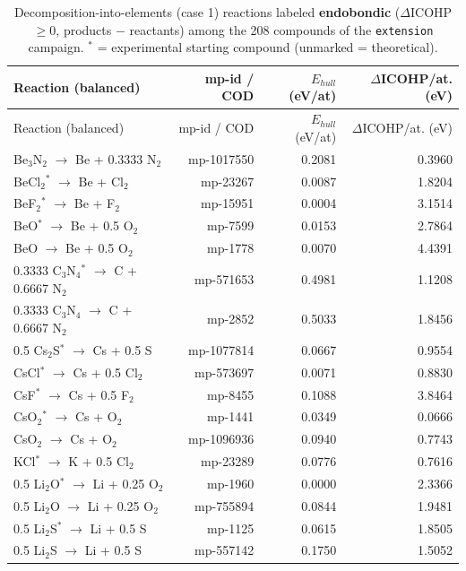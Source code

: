 \begin{longtable}{@{}lrrr@{}}
\caption{Decomposition-into-elements (case 1) reactions labeled \textbf{endobondic} ($\Delta$ICOHP $\geq 0$, products $-$ reactants) among the 208 compounds of the \texttt{extension} campaign. $^*$ = experimental starting compound (unmarked = theoretical).}\\
\toprule
Reaction (balanced) & mp-id / COD & $E_{hull}$ (eV/at) & $\Delta$ICOHP/at. (eV) \\
\midrule
\endfirsthead
\toprule
Reaction (balanced) & mp-id / COD & $E_{hull}$ (eV/at) & $\Delta$ICOHP/at. (eV) \\
\midrule
\endhead
\bottomrule
\endfoot
0.3333 Be$_{3}$N$_{2}$ $\rightarrow$ Be + 0.3333 N$_{2}$ & mp-1017550 & 0.2081 & 0.3960 \\
BeCl$_{2}$$^*$ $\rightarrow$ Be + Cl$_{2}$ & mp-23267 & 0.0087 & 1.8204 \\
BeF$_{2}$$^*$ $\rightarrow$ Be + F$_{2}$ & mp-15951 & 0.0004 & 3.1514 \\
BeO$^*$ $\rightarrow$ Be + 0.5 O$_{2}$ & mp-7599 & 0.0153 & 2.7864 \\
BeO $\rightarrow$ Be + 0.5 O$_{2}$ & mp-1778 & 0.0070 & 4.4391 \\
0.3333 C$_{3}$N$_{4}$$^*$ $\rightarrow$ C + 0.6667 N$_{2}$ & mp-571653 & 0.4981 & 1.1208 \\
0.3333 C$_{3}$N$_{4}$ $\rightarrow$ C + 0.6667 N$_{2}$ & mp-2852 & 0.5033 & 1.8456 \\
0.5 Cs$_{2}$S$^*$ $\rightarrow$ Cs + 0.5 S & mp-1077814 & 0.0667 & 0.9554 \\
CsCl$^*$ $\rightarrow$ Cs + 0.5 Cl$_{2}$ & mp-573697 & 0.0071 & 0.8830 \\
CsF$^*$ $\rightarrow$ Cs + 0.5 F$_{2}$ & mp-8455 & 0.1088 & 3.8464 \\
CsO$_{2}$$^*$ $\rightarrow$ Cs + O$_{2}$ & mp-1441 & 0.0349 & 0.0666 \\
CsO$_{2}$ $\rightarrow$ Cs + O$_{2}$ & mp-1096936 & 0.0940 & 0.7743 \\
KCl$^*$ $\rightarrow$ K + 0.5 Cl$_{2}$ & mp-23289 & 0.0776 & 0.7616 \\
0.5 Li$_{2}$O$^*$ $\rightarrow$ Li + 0.25 O$_{2}$ & mp-1960 & 0.0000 & 2.3366 \\
0.5 Li$_{2}$O $\rightarrow$ Li + 0.25 O$_{2}$ & mp-755894 & 0.0844 & 1.9481 \\
0.5 Li$_{2}$S$^*$ $\rightarrow$ Li + 0.5 S & mp-1125 & 0.0615 & 1.8505 \\
0.5 Li$_{2}$S $\rightarrow$ Li + 0.5 S & mp-557142 & 0.1750 & 1.5052 \\

\end{longtable}
